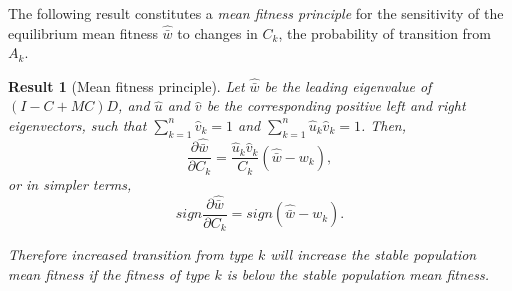\documentclass[12pt, twocolumn]{extarticle}
\newtheorem{result}{Result}
\begin{document}
The following result constitutes a \emph{mean fitness principle} for the
sensitivity of the equilibrium mean fitness $\hat{\bar w}$ to changes
in $C_k$, the probability of transition from $A_k$.
\medskip

\begin{result}[Mean fitness principle]\label{result:mfp}
Let $\hat{\bar w}$ be the leading eigenvalue of $(I-C+MC)D$,
and $\hat u$ and $\hat v$ be the corresponding positive left and right eigenvectors, such that $\sum_{k=1}^{n}\hat v_k=1$ and $\sum_{k=1}^{n}\hat u_k\hat v_k=1$.
Then,
\begin{equation}\label{eq:mfp}
\frac{\partial \hat{\bar w}}{\partial C_k} = 
\frac{\hat u_k \hat v_k}{C_k} (\hat{\bar w} - w_k),
\end{equation}
or in simpler terms,
\begin{equation}\label{eq:mfp_sign}
sign\frac{\partial \hat{\bar w}}{\partial C_k} = 
sign(\hat{\bar w} - w_k).
\end{equation}

Therefore increased transition from type $k$ will increase the stable population mean fitness if the fitness of type $k$ is below the stable population mean fitness.
\end{result}
\end{document}
